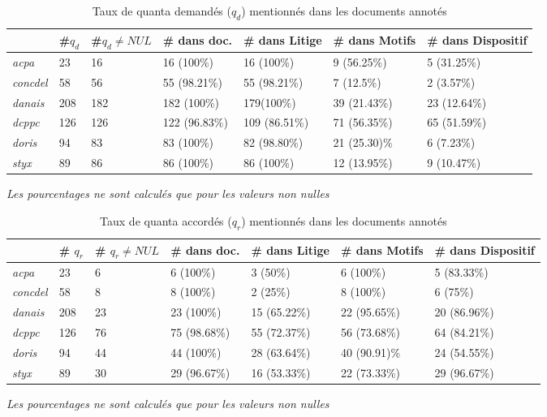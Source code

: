 \begin{table}[!htb]
	\footnotesize \centering
	\begin{tabular}{|l|l|l|l|l|l|l|}
		\hline
		& \textbf{\#$q_d$} & \textbf{\#$q_d\neq NUL$} & \textbf{\# dans doc.} & \textbf{\# dans Litige} & \textbf{\# dans Motifs} & \textbf{\# dans Dispositif} \\ \hline
		\textit{acpa} & 23 & 16 & 16 (100\%) & 16 (100\%) & 9 (56.25\%) & 5 (31.25\%) \\ \hline
		\textit{concdel} & 58 & 56 & 55 (98.21\%) & 55 (98.21\%) & 7 (12.5\%) & 2 (3.57\%) \\ \hline
		\textit{danais} & 208 & 182 & 182 (100\%) & 179(100\%) & 39 (21.43\%) & 23 (12.64\%) \\ \hline
		\textit{dcppc} & 126 & 126 & 122 (96.83\%) & 109 (86.51\%) & 71 (56.35\%) & 65 (51.59\%) \\ \hline
		\textit{doris} & 94 & 83 & 83 (100\%) & 82 (98.80\%) & 21 (25.30)\% & 6 (7.23\%) \\ \hline
		\textit{styx} & 89 & 86 & 86 (100\%) & 86 (100\%) & 12 (13.95\%) & 9 (10.47\%) \\ \hline
	\end{tabular}

	\textit{Les pourcentages ne sont calculés que pour les valeurs non nulles}
	\caption{Taux de quanta demandés ($q_d$) mentionnés dans les documents annotés} \label{tab:quanta:mentionQd}
\end{table}

\begin{table}[!htb]
	\footnotesize \centering
	\begin{tabular}{|l|l|l|l|l|l|l|}
		\hline
		& \textbf{\# $q_r$} & \textbf{\# $q_r\neq NUL$} & \textbf{\# dans doc.} & \textbf{\# dans Litige} & \textbf{\# dans Motifs} & \textbf{\# dans Dispositif} \\ \hline
		\textit{acpa} & 23 & 6 & 6 (100\%) & 3 (50\%) & 6 (100\%) & 5 (83.33\%) \\ \hline
		\textit{concdel} & 58 & 8 & 8 (100\%) & 2 (25\%) & 8 (100\%) & 6 (75\%) \\ \hline
		\textit{danais} & 208 & 23 & 23 (100\%) & 15 (65.22\%) & 22 (95.65\%) & 20 (86.96\%) \\ \hline
		\textit{dcppc} & 126 & 76 & 75 (98.68\%) & 55 (72.37\%) & 56 (73.68\%) & 64 (84.21\%) \\ \hline
		\textit{doris} & 94 & 44 & 44 (100\%) & 28 (63.64\%) & 40 (90.91)\% & 24 (54.55\%) \\ \hline
		\textit{styx} & 89 & 30 & 29 (96.67\%) & 16 (53.33\%) & 22 (73.33\%) & 29 (96.67\%) \\ \hline
	\end{tabular}

	\textit{Les pourcentages ne sont calculés que pour les valeurs non nulles}
	\caption{Taux de quanta accordés ($q_r$) mentionnés dans les documents annotés} \label{tab:quanta:mentionQr}
\end{table}

